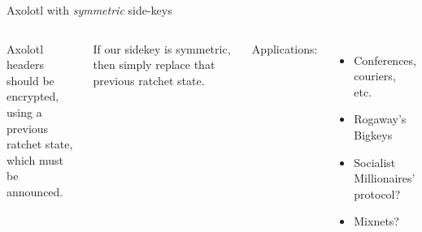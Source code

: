 \documentclass[fleqn,xcolor={usenames,dvipsnames}]{beamer}
\begin{document}
\begin{frame}{Axolotl with {\em symmetric} side-keys}
\begin{columns}[T]
Axolotl headers should be encrypted, \\
\hspace*{2pt} using a previous ratchet state, \\
\hspace*{2pt} which must be announced.

\medskip
If our sidekey is symmetric, then simply replace that previous ratchet state.

\bigskip
Applications:
\begin{itemize}
\item Conferences, couriers, etc.
\item Rogaway's Bigkeys
\item Socialist Millionaires' protocol?
\item Mixnets?
\end{itemize}


\end{columns}
\end{frame}
\end{document}
